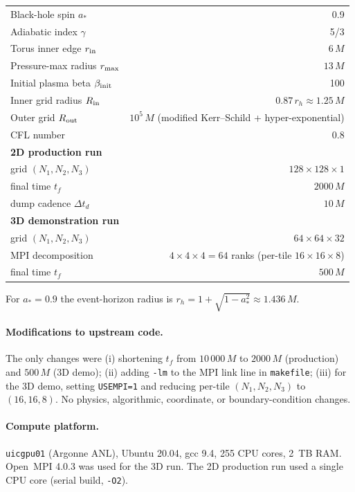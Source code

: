 \documentclass[11pt]{article}
\begin{document}
\begin{table}[h]
\centering
\begin{tabular}{lr}
\toprule
Black-hole spin $a_\ast$         & 0.9 \\
Adiabatic index $\gamma$         & 5/3 \\
Torus inner edge $r_{\rm in}$    & $6\,M$ \\
Pressure-max radius $r_{\rm max}$ & $13\,M$ \\
Initial plasma beta $\beta_{\rm init}$ & 100 \\
Inner grid radius $R_{\rm in}$   & $0.87\,r_h \approx 1.25\,M$ \\
Outer grid $R_{\rm out}$         & $10^5\,M$ (modified Kerr--Schild + hyper-exponential) \\
CFL number                       & 0.8 \\
\textbf{2D production run}       & \\
\quad grid $(N_1,N_2,N_3)$       & $128\times128\times1$ \\
\quad final time $t_f$           & $2000\,M$ \\
\quad dump cadence $\Delta t_d$  & $10\,M$ \\
\textbf{3D demonstration run}    & \\
\quad grid $(N_1,N_2,N_3)$       & $64\times64\times32$ \\
\quad MPI decomposition          & $4\times4\times4 = 64$ ranks (per-tile $16\times16\times8$) \\
\quad final time $t_f$           & $500\,M$ \\
\bottomrule
\end{tabular}
\end{table}

For $a_\ast = 0.9$ the event-horizon radius is $r_h = 1 + \sqrt{1-a_\ast^2} \approx 1.436\,M$.

\paragraph{Modifications to upstream code.}
The only changes were (i) shortening $t_f$ from $10\,000\,M$ to $2000\,M$ (production)
and $500\,M$ (3D demo); (ii) adding \verb|-lm| to the MPI link line in \texttt{makefile};
(iii) for the 3D demo, setting \texttt{USEMPI=1} and reducing per-tile $(N_1,N_2,N_3)$
to $(16,16,8)$. No physics, algorithmic, coordinate, or boundary-condition changes.

\paragraph{Compute platform.} \texttt{uicgpu01} (Argonne ANL), Ubuntu 20.04, gcc 9.4,
255 CPU cores, 2~TB RAM. Open~MPI 4.0.3 was used for the 3D run. The 2D production
run used a single CPU core (serial build, \verb|-O2|).
\end{document}
